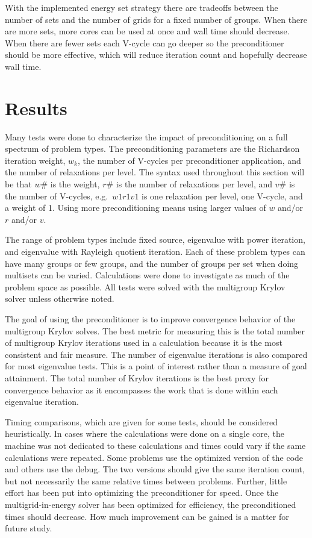 With the implemented energy set strategy there are tradeoffs between the number of sets and the number of grids for a fixed number of groups. When there are more sets, more cores can be used at once and wall time should decrease. When there are fewer sets each V-cycle can go deeper so the preconditioner should be more effective, which will reduce iteration count and hopefully decrease wall time. 

\section{Results}
Many tests were done to characterize the impact of preconditioning on a full spectrum of problem types. The preconditioning parameters are the Richardson iteration weight, $w_{k}$, the number of V-cycles per preconditioner application, and the number of relaxations per level. The syntax used throughout this section will be that $w\#$ is the weight, $r\#$ is the number of relaxations per level, and $v\#$ is the number of V-cycles, e.g.\ $w1r1v1$ is one relaxation per level, one V-cycle, and a weight of 1. Using more preconditioning means using larger values of $w$ and/or $r$ and/or $v$.  

The range of problem types include fixed source, eigenvalue with power iteration, and eigenvalue with Rayleigh quotient iteration. Each of these problem types can have many groups or few groups, and the number of groups per set when doing multisets can be varied. Calculations were done to investigate as much of the problem space as possible. All tests were solved with the multigroup Krylov solver unless otherwise noted. 

The goal of using the preconditioner is to improve convergence behavior of the multigroup Krylov solves. The best metric for measuring this is the total number of multigroup Krylov iterations used in a calculation because it is the most consistent and fair measure. The number of eigenvalue iterations is also compared for most eigenvalue tests. This is a point of interest rather than a measure of goal attainment. The total number of Krylov iterations is the best proxy for convergence behavior as it encompasses the work that is done within each eigenvalue iteration.  

Timing comparisons, which are given for some tests, should be considered heuristically. In cases where the calculations were done on a single core, the machine was not dedicated to these calculations and times could vary if the same calculations were repeated. Some problems use the optimized version of the code and others use the debug. The two versions should give the same iteration count, but not necessarily the same relative times between problems. Further, little effort has been put into optimizing the preconditioner for speed. Once the multigrid-in-energy solver has been optimized for efficiency, the preconditioned times should decrease. How much improvement can be gained is a matter for future study. 

